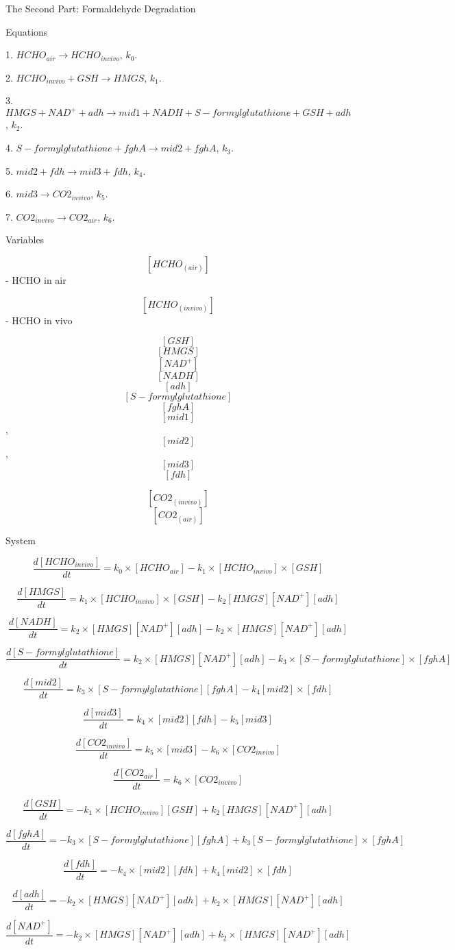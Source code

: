 \documentclass{article}
\begin{document}
The Second Part: Formaldehyde Degradation

Equations

1. \( HCHO_{air} \rightarrow HCHO_{in vivo} \), \( k_0 \).

2. \( HCHO_{in vivo} + GSH \rightarrow HMGS \), \( k_1 \).

3. \( HMGS + NAD^+ + adh \rightarrow mid1 + NADH + S - formylglutathione + GSH + adh \), \( k_2 \).

4. \( S - formylglutathione + fghA \rightarrow mid2 + fghA \), \( k_3 \).

5. \( mid2 + fdh \rightarrow mid3 + fdh \), \( k_4 \).

6. \( mid3 \rightarrow CO2_{in vivo} \), \( k_5 \).

7. \( CO2_{in vivo} \rightarrow CO2_{air} \), \( k_6 \).

Variables

\[ [HCHO_{(air)}] \] - HCHO in air

\[ [HCHO_{(in vivo)}] \] - HCHO in vivo

\[ [GSH] \] \[ [HMGS] \] \[ [NAD^+] \] \[ [NADH] \] \[ [adh] \] \[ [S-formylglutathione] \] \[ [fghA] \] \[ [mid1] \], \[ [mid2] \], \[ [mid3] \] \[ [fdh] \]

\[ [CO2_{(in vivo)}] \] \[ [CO2_{(air)}] \]

System

\[ \frac{d[HCHO_{in vivo}]}{dt} = k_0 \times [HCHO_{air}] - k_1 \times [HCHO_{in vivo}] \times [GSH] \]

\[ \frac{d[HMGS]}{dt} = k_1 \times [HCHO_{in vivo}] \times [GSH] - k_2[HMGS][NAD^+][adh] \]

\[ \frac{d[NADH]}{dt} = k_2 \times [HMGS][NAD^+][adh] - k_2 \times [HMGS][NAD^+][adh] \]

\[ \frac{d[S - formylglutathione]}{dt} = k_2 \times [HMGS][NAD^+][adh] - k_3 \times [S - formylglutathione] \times [fghA] \]

\[ \frac{d[mid2]}{dt} = k_3 \times [S - formylglutathione][fghA] - k_4[mid2] \times [fdh] \]

\[ \frac{d[mid3]}{dt} = k_4 \times [mid2][fdh] - k_5[mid3] \]

\[ \frac{d[CO2_{in vivo}]}{dt} = k_5 \times [mid3] - k_6 \times [CO2_{in vivo}] \]

\[ \frac{d[CO2_{air}]}{dt} = k_6 \times [CO2_{in vivo}] \]

\[ \frac{d[GSH]}{dt} = -k_1 \times [HCHO_{in vivo}][GSH] + k_2[HMGS][NAD^+][adh] \]

\[ \frac{d[fghA]}{dt} = -k_3 \times [S - formylglutathione][fghA] + k_3[S - formylglutathione] \times [fghA] \]

\[ \frac{d[fdh]}{dt} = -k_4 \times [mid2][fdh] + k_4[mid2] \times [fdh] \]

\[ \frac{d[adh]}{dt} = -k_2 \times [HMGS][NAD^+][adh] + k_2 \times [HMGS][NAD^+][adh] \]

\[ \frac{d[NAD^+]}{dt} = -k_2 \times [HMGS][NAD^+][adh] + k_2 \times [HMGS][NAD^+][adh] \]
\end{document}
